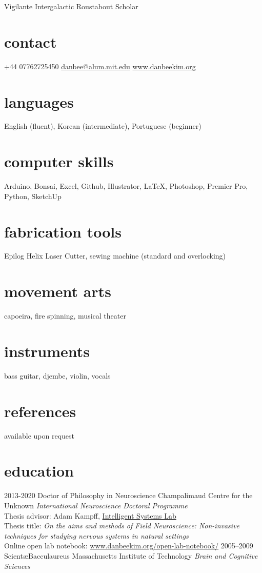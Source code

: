 \documentclass[]{friggeri-cv}
\begin{document}
       {Vigilante Intergalactic Roustabout Scholar}


\begin{aside}
  \section{contact}
    +44 07762725450
    \href{mailto:danbee@alum.mit.edu}{danbee@alum.mit.edu}
    \href{www.danbeekim.org}{www.danbeekim.org}
  \section{languages}
    English (fluent),
    Korean (intermediate),
    Portuguese (beginner)
  \section{computer skills}
    Arduino, Bonsai, Excel,
    Github, Illustrator, 
    \LaTeX, Photoshop,
    Premier Pro, Python,
    SketchUp
  \section{fabrication tools}
    Epilog Helix Laser Cutter, sewing machine (standard and overlocking)
  \section{movement arts}
    capoeira, fire spinning,
    musical theater
  \section{instruments}
    bass guitar, djembe,
    violin, vocals
  \section{references}
    available upon request        
\end{aside}

\section{education}

\begin{entrylist}
  \entry
    {2013-2020}
    {Doctor of Philosophy in Neuroscience}
    {Champalimaud Centre for the Unknown}
    {\emph{International Neuroscience Doctoral Programme}\\
    Thesis advisor: Adam Kampff, \href{www.kampff-lab.org}{Intelligent Systems Lab}\\
    Thesis title: \emph{On the aims and methods of Field Neuroscience: Non-invasive techniques for studying nervous systems in natural settings}\\
    Online open lab notebook: \href{http://www.danbeekim.org/open-lab-notebook/}{www.danbeekim.org/open-lab-notebook/}}
  \entry
    {2005–2009}
    {Scient\ae Bacculaureus}
    {Massachusetts Institute of Technology}
    {\emph{Brain and Cognitive Sciences}}
\end{entrylist}
\end{document}
